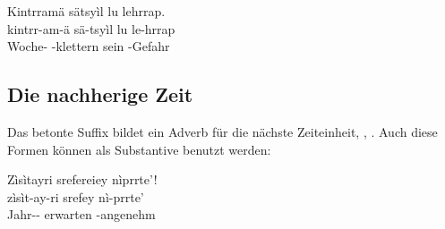\begin{interlin}
	\glll \Npawl{}Kintrramä sätsyìl lu lehrrap. \\
	kintrr-am-ä sä-tsyìl lu le-hrrap \\
	Woche- -klettern sein -Gefahr\\
\end{interlin}

\subsection{Die nachherige Zeit} Das betonte Suffix  bildet ein Adverb für die nächste Zeiteinheit,  ,  . Auch diese Formen können als Substantive benutzt werden: 

\begin{interlin}
	\glll \Npawl{}Zìsìtayri srefereiey nìprrte'! \\
	zìsìt-ay-ri srefey nì-prrte' \\
	Jahr-- erwarten -angenehm\\
\end{interlin}
